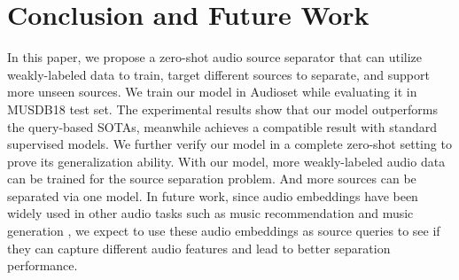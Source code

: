 \documentclass[letterpaper]{article} \usepackage{aaai22}  \usepackage{times}  \usepackage{helvet}  \usepackage{courier}  \usepackage[hyphens]{url}  \usepackage{graphicx} \urlstyle{rm} \def\UrlFont{\rm}  \usepackage{natbib}  \usepackage{caption} \DeclareCaptionStyle{ruled}{labelfont=normalfont,labelsep=colon,strut=off} \frenchspacing  \setlength{\pdfpagewidth}{8.5in}  \setlength{\pdfpageheight}{11in}  \usepackage{algorithm}
\begin{document}
\section{Conclusion and Future Work}\label{sec:conclusion}
In this paper, we propose a zero-shot audio source separator that can utilize weakly-labeled data to train, target different sources to separate, and support more unseen sources. We train our model in Audioset while evaluating it in MUSDB18 test set. The experimental results show that our model outperforms the query-based SOTAs, meanwhile achieves a compatible result with standard supervised models. We further verify our model in a complete zero-shot setting to prove its generalization ability. With our model, more weakly-labeled audio data can be trained for the source separation problem. And more sources can be separated via one model. In future work, since audio embeddings have been widely used in other audio tasks such as music recommendation \cite{ke-recom} and music generation , we expect to use these audio embeddings as source queries to see if they can capture different audio features and lead to better separation performance. 



\end{document}
